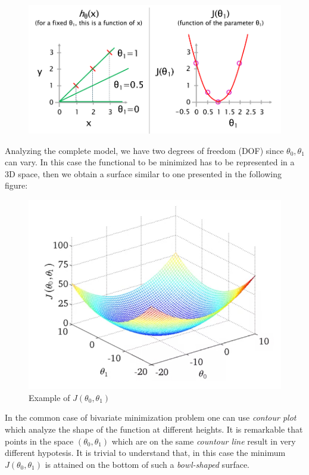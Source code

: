 \begin{figure}[h]
    \centering
    \includegraphics[scale=0.7]{img/J_univariate.png}
\end{figure}
\noindent
Analyzing the complete model, we have two degrees of freedom (DOF) since  $\theta_0, \theta_1$ can vary. In this case the functional to be minimized has to be represented in a 3D space, then we obtain a surface similar to one presented in the following figure:

\begin{figure}[h]\label{fig:surface}
   \centering
   \includegraphics[scale=0.7]{img/J_bivariate.png} 
   \caption{Example of $J(\theta_0, \theta_1)$}
\end{figure}

In the common case of bivariate minimization problem one can use \textit{contour plot} which analyze the shape of the function at different heights. It is remarkable that points in the space $(\theta_0, \theta_1)$ which are on the same \textit{countour line} result in very different hypotesis. It is trivial to understand that,  in this case the minimum $J(\theta_0, \theta_1)$ is attained on the bottom of such a \textit{bowl-shaped} surface.


